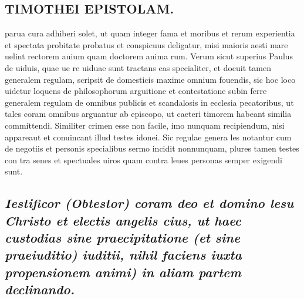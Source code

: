 \documentclass{article}
\begin{document}
\begin{pages}
\section*{TIMOTHEI EPISTOLAM. }
\marginpar{[ p.145 ]}\pstart parua cura adhiberi solet, ut quam integer fama et moribus et rerum experientia et spectata probitate probatus et conspicuus deligatur, misi maioris aesti mare uelint rectorem auium quam doctorem anima rum. Verum sicut superius Paulus de uiduis, quae ue re uiduae sunt tractans eas specialiter, et docuit tamen generalem regulam, scripsit de domesticis maxime omnium fouendis, sic hoc loco uidetur loquens de philosophorum arguitione et contestatione subin ferre generalem regulam de omnibus publicis et scandalosis in ecclesia pecatoribus, ut tales coram omnibus arguantur ab episcopo, ut caeteri timorem habeant similia committendi. Similiter crimen esse non facile, imo nunquam recipiendum, nisi appareaut et conuincant illud testes idonei. Sic regulae genera les notantur cum de negotiis et personis specialibus sermo incidit nonnunquam, plures tamen testes con tra senes et spectuales uiros quam contra leues personas semper exigendi sunt.  \pend
{}
{}
\subsection*{\textit{Iestificor (Obtestor) coram deo et domino lesu Christo et electis angelis cius, ut haec custodias sine praecipitatione (et sine praeiuditio) iuditii, nihil faciens iuxta propensionem animi) in aliam partem declinando. }}

\end{pages}
\end{document}
